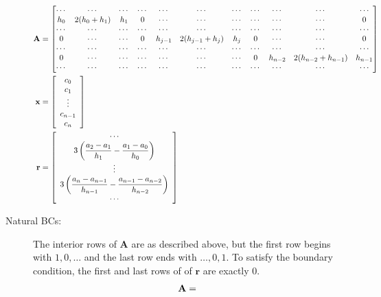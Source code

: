 \documentclass[12pt]{article}
\begin{document}
\begin{description}
\begin{align*}
\mathbf{A} & = \setcounter{MaxMatrixCols}{20}
\begin{bmatrix}
\cdots & \cdots & \cdots & \cdots & \cdots & \cdots & \cdots & \cdots & \cdots &\cdots & \cdots \\
h_0 & 2(h_0+h_1) & h_1 & 0 & \cdots & \cdots & \cdots& \cdots & \cdots &\cdots & 0\\
\cdots & \cdots & \cdots & \cdots & \cdots & \cdots & \cdots & \cdots & \cdots &\cdots & \cdots \\
0 & \cdots & \cdots & 0 & h_{j-1} & 2(h_{j-1}+h_{j}) & h_{j} & 0 & \cdots & \cdots & 0\\
\cdots & \cdots & \cdots & \cdots & \cdots & \cdots & \cdots & \cdots & \cdots &\cdots & \cdots \\
0 & \cdots & \cdots & \cdots& \cdots & \cdots &\cdots & 0 & h_{n-2} & 2(h_{n-2}+h_{n-1}) & h_{n-1}\\
\cdots & \cdots & \cdots & \cdots & \cdots & \cdots & \cdots & \cdots & \cdots &\cdots & \cdots \\
\end{bmatrix}\\
\mathbf{x} & = 
\left[\begin{array}{c}
c_0 \\
c_1 \\
\vdots \\
c_{n-1} \\
c_n \\
\end{array}\right]\\
\mathbf{r} & = 
\left[\begin{array}{c}
\cdots \\
3\left(\dfrac{a_2-a_1}{h_1} - \dfrac{a_1-a_0}{h_0}\right) \\
\vdots \\
3\left(\dfrac{a_n-a_{n-1}}{h_{n-1}} - \dfrac{a_{n-1}-a_{n-2}}{h_{n-2}}\right) \\
\cdots \\
\end{array}\right]
\end{align*}
\item[Natural BCs:] The interior rows of \(\mathbf{A}\) are as described above, but the first row begins with \(1, 0, \dots\) and the last row ends with \(\dots, 0, 1\).  To satisfy the boundary condition, the first and last rows of of \(\mathbf{r}\) are exactly \(0\).
\begin{align*}
\mathbf{A} & = \setcounter{MaxMatrixCols}{20}

\end{align*}
\end{description}
\end{document}
